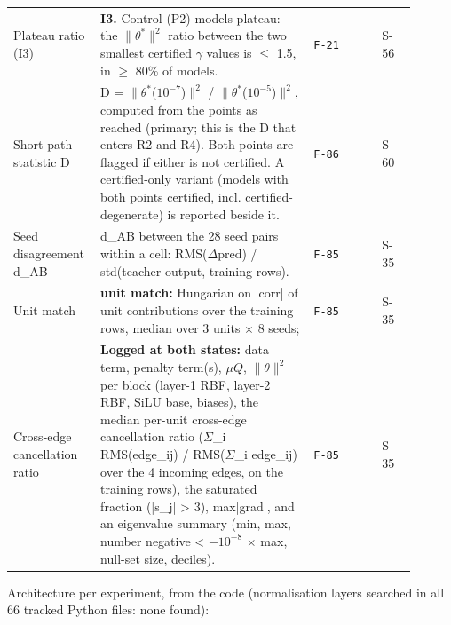 {\begin{longtable}{R{0.16\linewidth} R{0.50\linewidth} R{0.16\linewidth} R{0.08\linewidth}}
Plateau ratio (I3) & \textbf{I3.} Control (P2) models plateau: the $\|\theta^{*}\|^{2}$ ratio between the two smallest certified $\gamma$ values is $\leq$ 1.5, in $\geq$ 80\% of models. & \texttt{F-21} & S-56 \\
Short-path statistic D & D = $\|\theta^{*}$($10^{-7}$)$\|^{2}$ / $\|\theta^{*}$($10^{-5}$)$\|^{2}$, computed from the points as reached (primary; this is the D that enters R2 and R4). Both points are flagged if either is not certified. A certified-only variant (models with both points certified, incl. certified-degenerate) is reported beside it. & \texttt{F-86} & S-60 \\
Seed disagreement d\_AB & d\_AB between the 28 seed pairs within a cell: RMS($\Delta$pred) / std(teacher output, training rows). & \texttt{F-85} & S-35 \\
Unit match & \textbf{unit match:} Hungarian on |corr| of unit contributions over the training rows, median over 3 units $\times$ 8 seeds; & \texttt{F-85} & S-35 \\
Cross-edge cancellation ratio & \textbf{Logged at both states:} data term, penalty term(s), $\mu Q$, $\|\theta\|^{2}$ per block (layer-1 RBF, layer-2 RBF, SiLU base, biases), the median per-unit cross-edge cancellation ratio ($\Sigma$\_i RMS(edge\_ij) / RMS($\Sigma$\_i edge\_ij) over the 4 incoming edges, on the training rows), the saturated fraction (|s\_j| > 3), max|grad|, and an eigenvalue summary (min, max, number negative < $-10^{-8}$ $\times$ max, null-set size, deciles). & \texttt{F-85} & S-35 \\
\bottomrule
\end{longtable}}
\noindent Architecture per experiment, from the code (normalisation layers searched in all 66 tracked Python files: none found):
